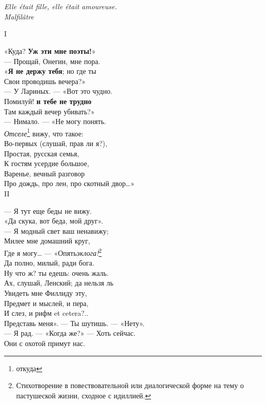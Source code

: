 \chapter{} %
\label{cap3} %

\textit{Elle était fille, elle était amoureuse.\\
Malfilâtre}

I

«Куда? \textbf{Уж эти мне поэты!}»\\
— Прощай, Онегин, мне пора.	\\
«\textbf{Я не держу тебя}; но где ты\\
Свои проводишь вечера?»\\
— У Лариных. — «Вот это чудно.\\
Помилуй! \textbf{и тебе не трудно}\\
Там каждый вечер убивать?»\\
— Нимало. — «Не могу понять.\\
\emph{Отселе}\footnote{откуда} вижу, что такое:\\
Во-первых (слушай, прав ли я?),\\
Простая, русская семья,\\
К гостям усердие большое,\\
Варенье, вечный разговор\\
Про дождь, про лен, про скотный двор…»\\

II

— Я тут еще беды не вижу.\\
«Да скука, вот беда, мой друг».\\
— Я модный свет ваш ненавижу;\\
Милее мне домашний круг,\\
Где я могу… — «Опять\emph{эклога!}\footnote{Стихотворение в повествовательной или диалогической форме на тему о пастушеской жизни, сходное с идиллией.}\\
Да полно, милый, ради бога.\\
Ну что ж? ты едешь: очень жаль.\\
Ах, слушай, Ленский; да нельзя ль\\
Увидеть мне Филлиду эту,\\
Предмет и мыслей, и пера,\\
И слез, и рифм et cetera?..\\
Представь меня». — Ты шутишь. — «Нету».\\
— Я рад. — «Когда же?» — Хоть сейчас.\\
Они с охотой примут нас.\\


